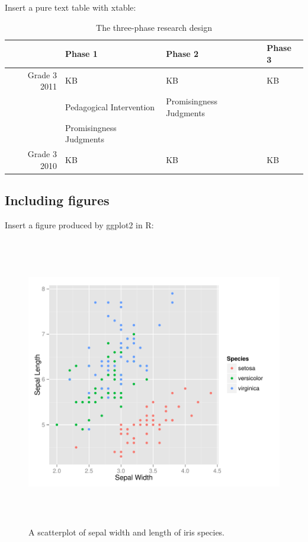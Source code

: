 \documentclass[man]{apa6}\usepackage{knitr}
\begin{document}
Insert a pure text table with xtable:

\begin{table}[!htb]
\begin{center}
\caption{The three-phase research design}
\label{tab:procedures}
\begin{tabular}{rlll}
  \hline
 & Phase 1 & Phase 2 & Phase 3 \\ 
  \hline
Grade 3 2011 & KB & KB & KB \\ 
    & Pedagogical Intervention & Promisingness Judgments &  \\ 
     & Promisingness Judgments &  &  \\ 
  Grade 3 2010 & KB & KB & KB \\ 
   \hline
\end{tabular}
\end{center}
\end{table}



\subsection{Including figures}

Insert a figure produced by ggplot2 in R:




\begin{figure}
\centering
\includegraphics[width=6in,height=5in]{scatterplot.pdf}
\caption{A scatterplot of sepal width and length of iris species.}
\label{fig:scatterplot}
\end{figure}
\end{document}
